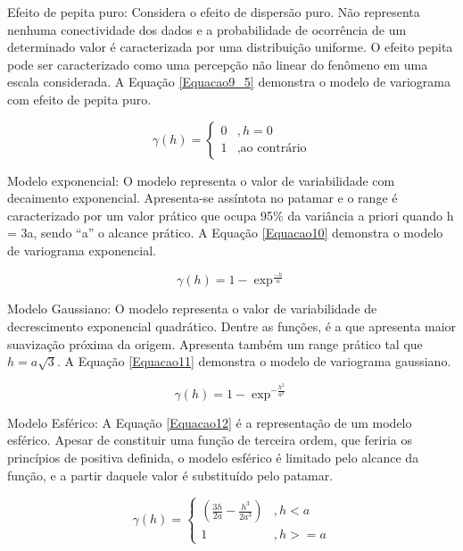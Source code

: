 Efeito de pepita puro: Considera o efeito de dispersão puro. Não representa nenhuma conectividade dos dados e a probabilidade de ocorrência de um determinado valor é caracterizada por uma distribuição uniforme. O efeito pepita pode ser caracterizado como uma percepção não linear do fenômeno em uma escala considerada. A Equação \ref{Equacao9_5} demonstra o modelo de variograma com efeito de pepita puro.

\begin{equation}\label{Equacao9_5}
\gamma(h) = \begin{cases}
0 & , h =0 \\
1 &,\text{ao contrário}
\end{cases}
\end{equation}


Modelo exponencial: O modelo representa o valor de variabilidade com decaimento exponencial. Apresenta-se assíntota no patamar e o range é caracterizado por um valor prático que ocupa 95\% da variância a priori quando h = 3a, sendo “a” o alcance prático. A Equação \ref{Equacao10} demonstra o modelo de variograma exponencial.

\begin{equation}\label{Equacao10}
\gamma(h) = 1 - \exp^{\frac{-h}{a}}
\end{equation}

Modelo Gaussiano: O modelo representa o valor de variabilidade de decrescimento exponencial quadrático. Dentre as funções, é a que apresenta maior suavização próxima da origem. Apresenta também um range prático tal que $h=a\sqrt{3}$. A Equação \ref{Equacao11} demonstra o modelo de variograma gaussiano.

\begin{equation}\label{Equacao11}
\gamma(h) = 1 - \exp^{-\frac{h^2}{a^2}}
\end{equation}

Modelo Esférico: A Equação \ref{Equacao12} é a representação de um modelo esférico. Apesar de constituir uma função de terceira ordem, que feriria os princípios de positiva definida, o modelo esférico é limitado pelo alcance da função, e a partir daquele valor é substituído pelo patamar. 

\begin{equation}\label{Equacao12}
\gamma(h) = \begin{cases}
\left( \frac{3h}{2a} - \frac{h^3}{2a^3} \right)  &, h < a \\
1 & , h >= a
\end{cases}
\end{equation}

